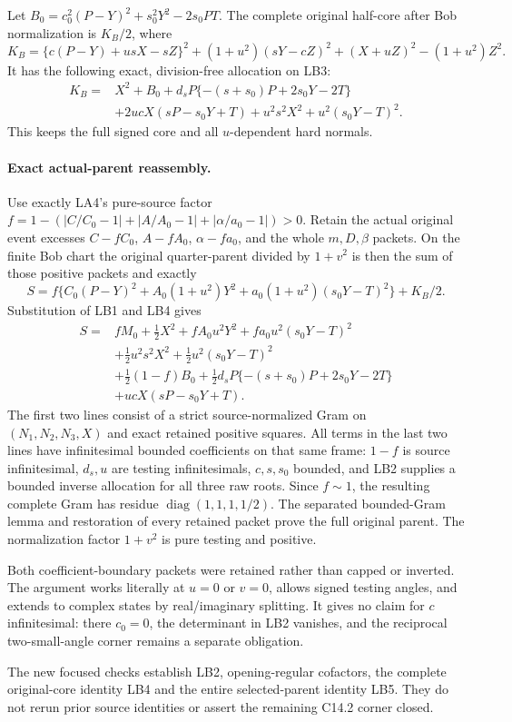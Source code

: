 Let $B_0=c_0^2(P-Y)^2+s_0^2Y^2-2s_0PT$.
The complete original half-core after Bob normalization is
$K_B/2$, where
\[
 K_B=\{c(P-Y)+usX-sZ\}^2
       +(1+u^2)(sY-cZ)^2+(X+uZ)^2-(1+u^2)Z^2.
\]
It has the following exact, division-free allocation on LB3:
\[
\begin{split}
 K_B={}&X^2+B_0
       +d_sP\{-(s+s_0)P+2s_0Y-2T\}\\
       &+2ucX(sP-s_0Y+T)
       +u^2s^2X^2+u^2(s_0Y-T)^2.
\end{split} \tag{LB4}
\]
This keeps the full signed core and all $u$-dependent hard normals.

\paragraph{Exact actual-parent reassembly.}
Use exactly LA4's pure-source factor
$f=1-(|C/C_0-1|+|A/A_0-1|+|\alpha/a_0-1|)>0$.
Retain the actual original event excesses
$C-fC_0$, $A-fA_0$, $\alpha-fa_0$, and the whole $m,D,\beta$
packets.  On the finite Bob chart the original quarter-parent divided
by $1+v^2$ is then the sum of those positive packets and exactly
\[
 S=f\{C_0(P-Y)^2+A_0(1+u^2)Y^2
                         +a_0(1+u^2)(s_0Y-T)^2\}+K_B/2.
\]
Substitution of LB1 and LB4 gives
\[
\begin{split}
 S={}&fM_0+\tfrac12X^2
       +fA_0u^2Y^2+fa_0u^2(s_0Y-T)^2\\
    &+\tfrac12u^2s^2X^2+\tfrac12u^2(s_0Y-T)^2\\
    &+\tfrac12(1-f)B_0
       +\tfrac12d_sP\{-(s+s_0)P+2s_0Y-2T\}\\
    &+ucX(sP-s_0Y+T).
\end{split} \tag{LB5}
\]
The first two lines consist of a strict source-normalized Gram on
$(N_1,N_2,N_3,X)$ and exact retained positive squares.  All terms
in the last two lines have infinitesimal bounded coefficients on
that same frame: $1-f$ is source infinitesimal, $d_s,u$ are testing
infinitesimals, $c,s,s_0$ bounded, and LB2 supplies a bounded inverse
allocation for all three raw roots.  Since $f\sim1$, the resulting
complete Gram has residue $\operatorname{diag}(1,1,1,1/2)$.
The separated bounded-Gram lemma and restoration of every retained
packet prove the full original parent.  The normalization factor
$1+v^2$ is pure testing and positive.

Both coefficient-boundary packets were retained rather than capped
or inverted.  The argument works literally at $u=0$ or $v=0$,
allows signed testing angles, and extends to complex states by
real/imaginary splitting.  It gives no claim for $c$ infinitesimal:
there $c_0=0$, the determinant in LB2 vanishes, and the reciprocal
two-small-angle corner remains a separate obligation.

The new focused checks establish LB2, opening-regular cofactors,
the complete original-core identity LB4 and the entire selected-parent
identity LB5.  They do not rerun prior source identities or assert
the remaining C14.2 corner closed.
